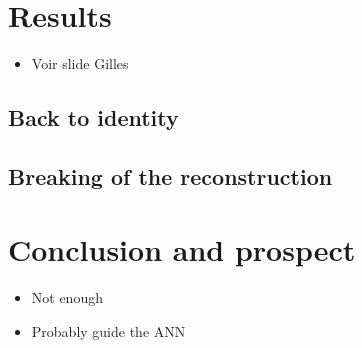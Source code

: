 \documentclass[../main.tex]{subfiles}
\begin{document}
\section{Results}
\label{sec:janne:results}

\begin{itemize}
  \item Voir slide Gilles
\end{itemize}

\subsection{Back to identity}
\label{sec:janne:results:identity}

\subsection{Breaking of the reconstruction}
\label{sec:janne:results:break}

\section{Conclusion and prospect}
\label{sec:janne:conclusion}
\begin{itemize}
  \item Not enough
  \item Probably guide the ANN
\end{itemize}
\end{document}
